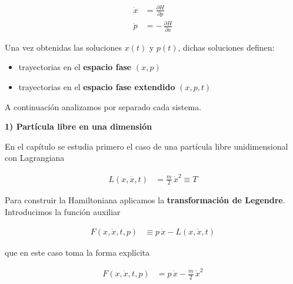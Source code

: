 \documentclass{article}
\begin{document}
\begin{equation}
\begin{split}
\dot{x} &= \frac{\partial H}{\partial p} \\
\dot{p} &= -\,\frac{\partial H}{\partial x}
\end{split}
\label{eq:hamilton-ecuaciones-generales}
\end{equation}

Una vez obtenidas las soluciones $x(t)$ y $p(t)$, dichas soluciones definen:

\begin{itemize}
  \item[$\bullet$] trayectorias en el \textbf{espacio fase} $(x,p)$
  \item[$\bullet$] trayectorias en el \textbf{espacio fase extendido} $(x,p,t)$
\end{itemize}

A continuación analizamos por separado cada sistema.


\vspace{0.4cm}
\textbf{1) Partícula libre en una dimensión}

En el capítulo se estudia primero el caso de una partícula libre unidimensional con
Lagrangiana

\begin{equation}
\begin{split}
L(x,\dot{x},t) &= \frac{m}{2}\,\dot{x}^{2} \equiv T
\end{split}
\label{eq:L-libre-1D}
\end{equation}

Para construir la Hamiltoniana aplicamos la \textcolor{trueblue}{\textbf{transformación de Legendre}}.
Introducimos la función auxiliar

\begin{equation}
\begin{split}
F(x,\dot{x},t,p) &\equiv p\,\dot{x} - L(x,\dot{x},t)
\end{split}
\label{eq:F-legendre-libre}
\end{equation}

que en este caso toma la forma explícita

\begin{equation}
\begin{split}
F(x,\dot{x},t,p)
&= p\,\dot{x} - \frac{m}{2}\,\dot{x}^{2}
\end{split}
\label{eq:F-legendre-libre-explicita}
\end{equation}
\end{document}
